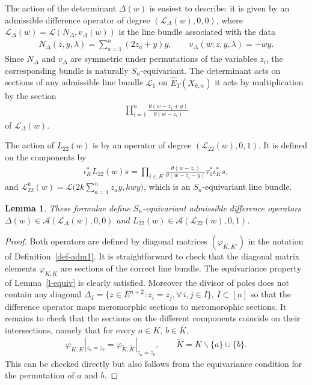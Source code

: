 \documentclass[10pt,a4paper]{amsart}
\numberwithin{equation}{section}
\newtheorem{Lemma}[Theorem]{Lemma}
\begin{document}
The action of the determinant $\Delta(w)$ is easiest to describe: it is given by an admissible difference operator of degree $(\mathcal L_\Delta(w),0,0)$, where $\mathcal L_\Delta(w)=\mathcal L(N_\Delta,v_\Delta(w))$ is the line bundle associated with the data
\begin{gather*}
 N_\Delta(z,y,\lambda)= \sum_{a=1}^n (2z_a+y)y, \qquad v_\Delta(w;z,y,\lambda)=-wy.
\end{gather*}
Since $N_\Delta$ and $v_\Delta$ are symmetric under permutations of the variables $z_i$, the corresponding bundle is naturally $S_n$-equivariant. The determinant acts on sections of any admissible line bundle $\mathcal L_1$ on $\hat E_T(X_{k,n})$ it acts by multiplication by the section
\begin{gather*}
 \prod_{i=1}^n\frac{\theta(w-z_i+y)}{\theta(w-z_i)}
\end{gather*}
of $\mathcal L_\Delta(w)$.

The action of $L_{22}(w)$ is by an operator of degree $(\mathcal L_{22}(w),0,1)$. It is defined on the components by
\begin{gather*}
 \iota^*_KL_{22}(w)s=\prod_{i\in K}\frac{\theta(w-z_i)}{\theta(w-z_i-y)} \tau_1^*\iota_K^*s,
\end{gather*}
and $\mathcal L^k_{22}(w)=\mathcal L\Big(2k\sum\limits_{a=1}^nz_ay,kwy\Big)$, which is an $S_n$-equivariant line bundle.
\begin{Lemma}\label{l-L22Delta} These formulae define $S_n$-equivariant admissible difference operators $\Delta(w)\in\mathcal A(\mathcal L_\Delta(w),0,0)$ and $L_{22}(w)\in\mathcal A(\mathcal L_{22}(w),0,1)$.
\end{Lemma}
\begin{proof} Both operators are defined by diagonal matrices $(\varphi_{K,K'})$ in the notation of Definition~\ref{def-adm1}. It is straightforward to check that the diagonal matrix elements $\varphi_{K,K}$ are sections of the correct line bundle. The equivariance property of Lemma~\ref{l-equiv} is clearly satisfied. Moreover the divisor of poles does not contain any diagonal $\Delta_I=\big\{z\in E^{n+2}\colon z_i=z_j, \forall\, i,j\in I\big\}$, $I\subset[n]$ so that the difference operator maps meromorphic sections to meromorophic sections. It remains to check that the sections on the different components coincide on their intersections, namely that for every $a\in K$, $b\in\bar K$,
 \begin{gather*}
 \varphi_{K,K}|_{z_a=z_b}=\varphi_{\tilde K,\tilde K}|_{z_a=z_b}, \qquad \tilde K=K\smallsetminus \{a\}\cup\{b\}.
 \end{gather*}
 This can be checked directly but also follows from the equivariance condition for the permutation of $a$ and $b$.
\end{proof}
\end{document}

